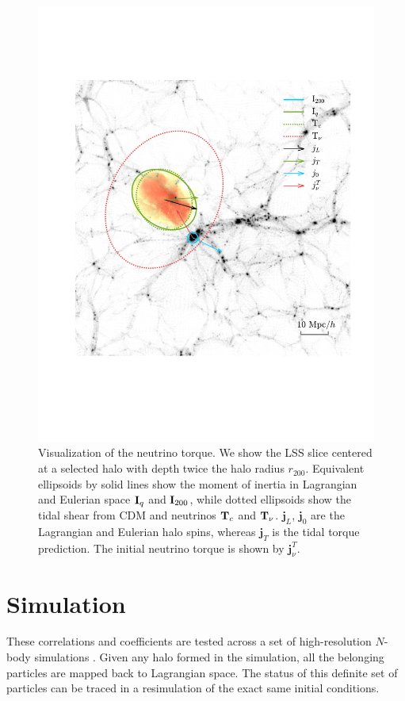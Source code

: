 \documentclass[aps,prd,twocolumn,amsmath,amssymb,amsfont,superscriptaddress,nofootinbib]{revtex4-1}
\newcommand{\bs}{\boldsymbol}
\newcommand{\T}{\bold{T}}
\newcommand{\I}{\bold{I}}
\newcommand{\spin}{\bs{j}}
\begin{document}
\begin{figure}
\centering
  \includegraphics[width=1\linewidth]{f1}
 \caption{Visualization of the neutrino torque. 
 We show the LSS slice centered at a selected halo with depth twice the halo radius $r_{200}$. 
 Equivalent ellipsoids by solid lines show the moment of inertia in Lagrangian and Eulerian space $\I_q$ and $\I_{200}$, 
 while dotted ellipsoids show the tidal shear from CDM and neutrinos $\T_c$ and $\T_\nu$. $\spin_L$, 
 $\spin_0$ are the Lagrangian and Eulerian halo spins, whereas $\spin_T$ is the tidal torque prediction. 
 The initial neutrino torque is shown by $\spin^T_\nu$.}\label{fig.1}
\end{figure}

\section{Simulation}\label{label.sim}
These correlations and coefficients are tested across a set of high-resolution $N$-body simulations \citep{2018ApJS..237...24Y}. 
Given any halo formed in the simulation, all the belonging particles are mapped back to Lagrangian space. 
The status of this definite set of particles can be traced in a resimulation of the exact same initial conditions.
\end{document}
